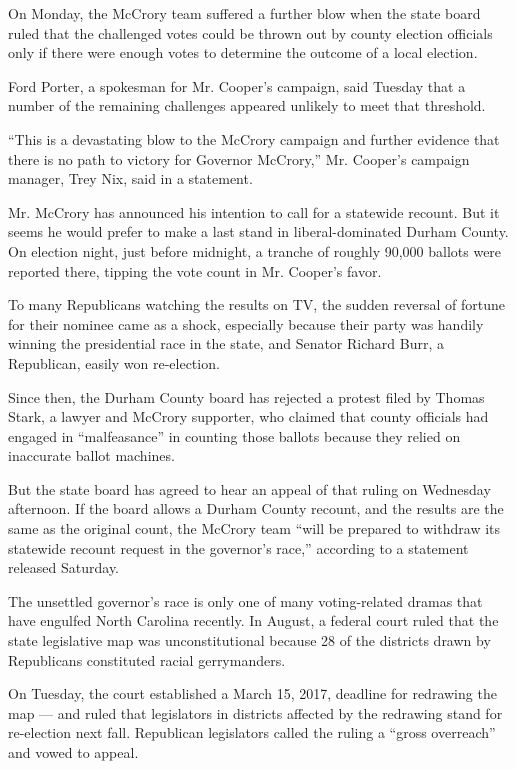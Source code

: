 On Monday, the McCrory team suffered a further blow when the state board
ruled that the challenged votes could be thrown out by county election
officials only if there were enough votes to determine the outcome of a
local election.

Ford Porter, a spokesman for Mr. Cooper's campaign, said Tuesday that a
number of the remaining challenges appeared unlikely to meet that
threshold.

``This is a devastating blow to the McCrory campaign and further
evidence that there is no path to victory for Governor McCrory,'' Mr.
Cooper's campaign manager, Trey Nix, said in a statement.

Mr. McCrory has announced his intention to call for a statewide recount.
But it seems he would prefer to make a last stand in liberal-dominated
Durham County. On election night, just before midnight, a tranche of
roughly 90,000 ballots were reported there, tipping the vote count in
Mr. Cooper's favor.

To many Republicans watching the results on TV, the sudden reversal of
fortune for their nominee came as a shock, especially because their
party was handily winning the presidential race in the state, and
Senator Richard Burr, a Republican, easily won re-election.

Since then, the Durham County board has rejected a protest filed by
Thomas Stark, a lawyer and McCrory supporter, who claimed that county
officials had engaged in ``malfeasance'' in counting those ballots
because they relied on inaccurate ballot machines.

But the state board has agreed to hear an appeal of that ruling on
Wednesday afternoon. If the board allows a Durham County recount, and
the results are the same as the original count, the McCrory team ``will
be prepared to withdraw its statewide recount request in the governor's
race,'' according to a statement released Saturday.

The unsettled governor's race is only one of many voting-related dramas
that have engulfed North Carolina recently. In August, a federal court
ruled that the state legislative map was unconstitutional because 28 of
the districts drawn by Republicans constituted racial gerrymanders.

On Tuesday, the court established a March 15, 2017, deadline for
redrawing the map --- and ruled that legislators in districts affected
by the redrawing stand for re-election next fall. Republican legislators
called the ruling a ``gross overreach'' and vowed to appeal.

